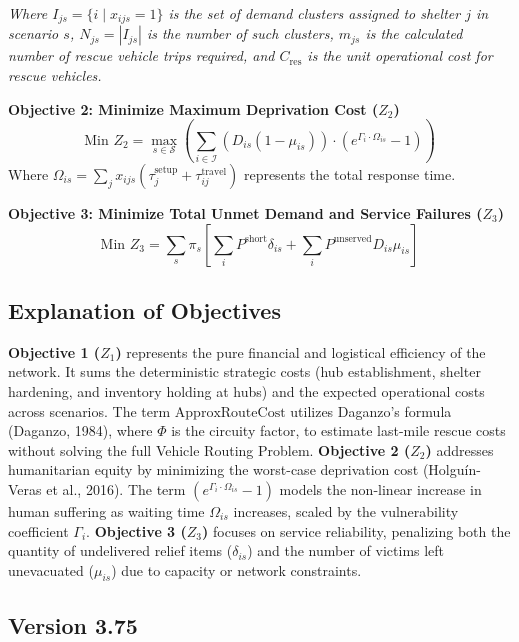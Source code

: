{\noindent \textit{Where $I_{js} = \{i \mid x_{ijs} = 1\}$ is the set of demand clusters assigned to shelter $j$ in scenario $s$, $N_{js} = |I_{js}|$ is the number of such clusters, $m_{js}$ is the calculated number of rescue vehicle trips required, and $C_{\text{res}}$ is the unit operational cost for rescue vehicles.}

\textbf{Objective 2: Minimize Maximum Deprivation Cost ($Z_2$)}
\begin{equation} \label{eq:obj2}
    \text{Min } Z_2 = \max_{s \in \mathcal{S}} \left( \sum_{i \in \mathcal{I}} (D_{is} (1-\mu_{is})) \cdot \left( e^{\Gamma_i \cdot \Omega_{is}} - 1 \right) \right)
\end{equation}
\noindent Where $\Omega_{is} = \sum_{j} x_{ijs} (\tau_{j}^{\text{setup}} + \tau_{ij}^{\text{travel}})$ represents the total response time.

\textbf{Objective 3: Minimize Total Unmet Demand and Service Failures ($Z_3$)}
\begin{equation} \label{eq:obj3}
    \text{Min } Z_3 = \sum_{s} \pi_s \left[ \sum_{i} P^{\text{short}} \delta_{is} + \sum_{i} P^{\text{unserved}} D_{is} \mu_{is} \right]
\end{equation}

\subsection*{Explanation of Objectives}
\noindent \textbf{Objective 1 ($Z_1$)} represents the pure financial and logistical efficiency of the network. It sums the deterministic strategic costs (hub establishment, shelter hardening, and inventory holding at hubs) and the expected operational costs across scenarios. The term $\text{ApproxRouteCost}$ utilizes Daganzo's formula (Daganzo, 1984), where $\Phi$ is the circuity factor, to estimate last-mile rescue costs without solving the full Vehicle Routing Problem.
\textbf{Objective 2 ($Z_2$)} addresses humanitarian equity by minimizing the worst-case deprivation cost (Holguín-Veras et al., 2016). The term $(e^{\Gamma_i \cdot \Omega_{is}} - 1)$ models the non-linear increase in human suffering as waiting time $\Omega_{is}$ increases, scaled by the vulnerability coefficient $\Gamma_i$.
\textbf{Objective 3 ($Z_3$)} focuses on service reliability, penalizing both the quantity of undelivered relief items ($\delta_{is}$) and the number of victims left unevacuated ($\mu_{is}$) due to capacity or network constraints.

\subsection{Version 3.75}

}
